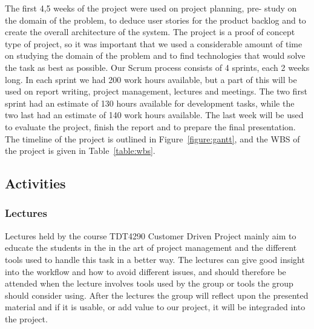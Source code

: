 The first 4,5 weeks of the project were used on project planning, pre- study on the domain of the problem, to deduce user stories for the product backlog and to create the overall architecture of the system. The project is a proof of concept type of project, so it was important that we used a considerable amount of time on studying the domain of the problem and to find technologies that would solve the task as best as possible. Our Scrum process consists of 4 sprints, each 2 weeks long. In each sprint we had 200 work hours available, but a part of this will be used on report writing, project management, lectures and meetings. The two first sprint had an estimate of 130 hours available for development tasks, while the two last had an estimate of 140 work hours available. The last week will be used to evaluate the project, finish the report and to prepare the final presentation. The timeline of the project is outlined in Figure~\ref{figure:gantt}, and the WBS of the project is given in Table~\ref{table:wbs}.

\subsection{Activities}
\subsubsection{Lectures}
Lectures held by the course TDT4290 Customer Driven Project mainly aim to educate the students in the in the art of project management and the different tools used to handle this task in a better way. The lectures can give good insight into the workflow and how to avoid different issues, and should therefore be attended when the lecture involves tools used by the group or tools the group should consider using. After the lectures the group will reflect upon the presented material and if it is usable, or add value to our project, it will be integraded into the project.

